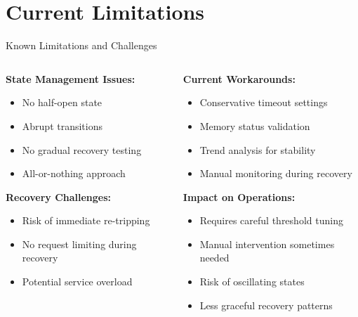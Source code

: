 \documentclass[aspectratio=169]{beamer}
\newcommand{\alertred}[1]{\textcolor{red}{#1}}
\begin{document}
\section{Current Limitations}

\begin{frame}{Known Limitations and Challenges}
    \begin{columns}
        \begin{column}{0.5\textwidth}
            \textbf{State Management Issues:}
            \begin{itemize}
                \item[\alertred{\faTimes}] No half-open state
                \item[\alertred{\faTimes}] Abrupt transitions
                \item[\alertred{\faTimes}] No gradual recovery testing
                \item[\alertred{\faTimes}] All-or-nothing approach
            \end{itemize}
            
            \vspace{0.3cm}
            \textbf{Recovery Challenges:}
            \begin{itemize}
                \item[\alertred{\faTimes}] Risk of immediate re-tripping
                \item[\alertred{\faTimes}] No request limiting during recovery
                \item[\alertred{\faTimes}] Potential service overload
            \end{itemize}
        \end{column}
        \begin{column}{0.5\textwidth}
            \textbf{Current Workarounds:}
            \begin{itemize}
                \item Conservative timeout settings
                \item Memory status validation
                \item Trend analysis for stability
                \item Manual monitoring during recovery
            \end{itemize}
            
            \vspace{0.3cm}
            \textbf{Impact on Operations:}
            \begin{itemize}
                \item Requires careful threshold tuning
                \item Manual intervention sometimes needed
                \item Risk of oscillating states
                \item Less graceful recovery patterns
            \end{itemize}
        \end{column}
    \end{columns}
    

\end{frame}
\end{document}
